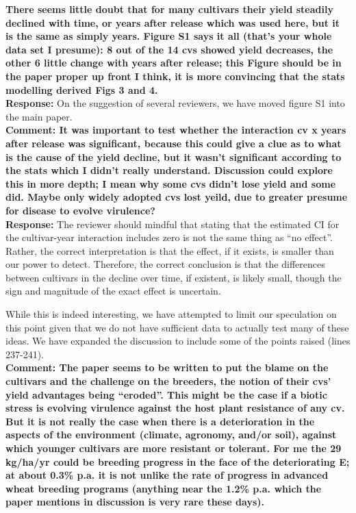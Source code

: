 \documentclass{article} \usepackage[margin=1in]{geometry}
\begin{document}
\textbf{There seems little doubt that for many cultivars their yield
  steadily declined with time, or years after release which was used
  here, but it is the same as simply years. Figure S1 says it all
  (that’s your whole data set I presume): 8 out of the 14 cvs showed
  yield decreases, the other 6 little change with years after release;
  this Figure should be in the paper proper up front I think, it is
  more convincing that the stats modelling derived Figs 3 and 4.}\\

\textbf{Response:} On the suggestion of several reviewers, we have
moved figure S1 into the main paper.\\

\textbf{Comment: It was important to test whether the interaction cv x
  years after release was significant, because this could give a clue
  as to what is the cause of the yield decline, but it wasn’t
  significant according to the stats which I didn’t really
  understand. Discussion could explore this in more depth; I mean why
  some cvs didn’t lose yield and some did. Maybe only widely adopted
  cvs lost yeild, due to greater presume for disease to evolve
  virulence?}\\

\textbf{Response:} The reviewer should mindful that stating that the
estimated CI for the cultivar-year interaction includes zero is not
the same thing as ``no effect''. Rather, the correct interpretation is
that the effect, if it exists, is smaller than our power to
detect. Therefore, the correct conclusion is that the differences
between cultivars in the decline over time, if existent, is likely
small, though the sign and magnitude of the exact effect is uncertain.

While this is indeed interesting, we have attempted to limit our
speculation on this point given that we do not have sufficient data to
actually test many of these ideas. We have expanded the discussion to
include some of the points raised (lines 237-241). \\

\textbf{Comment: The paper seems to be written to put the blame on the
  cultivars and the challenge on the breeders, the notion of their
  cvs’ yield advantages being “eroded”. This might be the case if a
  biotic stress is evolving virulence against the host plant
  resistance of any cv.  But it is not really the case when there is a
  deterioration in the aspects of the environment (climate, agronomy,
  and/or soil), against which younger cultivars are more resistant or
  tolerant.  For me the 29 kg/ha/yr could be breeding progress in the
  face of the deteriorating E; at about 0.3\% p.a. it is not unlike
  the rate of progress in advanced wheat breeding programs (anything
  near the 1.2\% p.a. which the paper mentions in discussion is very
  rare these days).}\\
\end{document}
